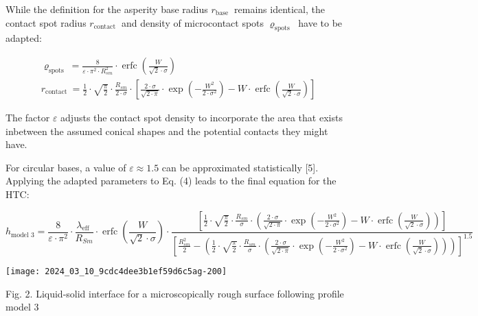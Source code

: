 \documentclass[10pt]{article}
\begin{document}
While the definition for the asperity base radius $r_{\text {base }}$ remains identical, the contact spot radius $r_{\text {contact }}$ and density of microcontact spots $\varrho_{\text {spots }}$ have to be adapted:


\begin{gather*}
\varrho_{\text {spots }}=\frac{8}{\varepsilon \cdot \pi^{2} \cdot R_{s m}^{2}} \cdot \operatorname{erfc}\left(\frac{W}{\sqrt{2} \cdot \sigma}\right)  \tag{11}\\
r_{\text {contact }}=\frac{1}{2} \cdot \sqrt{\frac{\pi}{2}} \cdot \frac{R_{s m}}{2 \cdot \sigma} \cdot\left[\frac{2 \cdot \sigma}{\sqrt{2 \cdot \pi}} \cdot \exp \left(-\frac{W^{2}}{2 \cdot \sigma^{2}}\right)-W \cdot \operatorname{erfc}\left(\frac{W}{\sqrt{2} \cdot \sigma}\right)\right] \tag{12}
\end{gather*}


The factor $\varepsilon$ adjusts the contact spot density to incorporate the area that exists inbetween the assumed conical shapes and the potential contacts they might have.

For circular bases, a value of $\varepsilon \approx 1.5$ can be approximated statistically [5]. Applying the adapted parameters to Eq. (4) leads to the final equation for the HTC:


\begin{equation*}
h_{\text {model } 3}=\frac{8}{\varepsilon \cdot \pi^{2}} \cdot \frac{\lambda_{\text {eff }}}{R_{S m}} \cdot \operatorname{erfc}\left(\frac{W}{\sqrt{2} \cdot \sigma}\right) \cdot \frac{\left[\frac{1}{2} \cdot \sqrt{\frac{\pi}{2}} \cdot \frac{R_{s m}}{\sigma} \cdot\left(\frac{2 \cdot \sigma}{\sqrt{2 \cdot \pi}} \cdot \exp \left(-\frac{W^{2}}{2 \cdot \sigma^{2}}\right)-W \cdot \operatorname{erfc}\left(\frac{W}{\sqrt{2} \cdot \sigma}\right)\right)\right]}{\left[\frac{R_{s m}^{2}}{2}-\left(\frac{1}{2} \cdot \sqrt{\frac{\pi}{2}} \cdot \frac{R_{s m}}{\sigma} \cdot\left(\frac{2 \cdot \sigma}{\sqrt{2 \cdot \pi}} \cdot \exp \left(-\frac{W^{2}}{2 \cdot \sigma^{2}}\right)-W \cdot \operatorname{erfc}\left(\frac{W}{\sqrt{2} \cdot \sigma}\right)\right)\right)\right]^{1.5}} \tag{13}
\end{equation*}


\begin{center}
\texttt{[image: 2024\_03\_10\_9cdc4dee3b1ef59d6c5ag-200]}
\end{center}

Fig. 2. Liquid-solid interface for a microscopically rough surface following profile model 3
\end{document}

